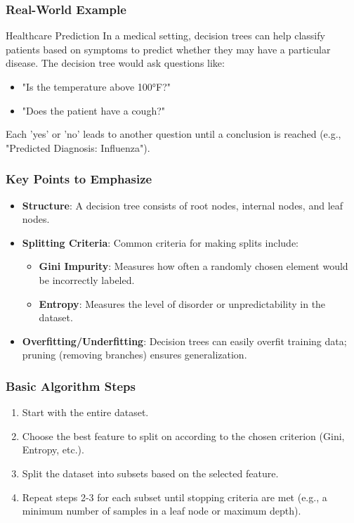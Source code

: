 \documentclass[aspectratio=169]{beamer}
\begin{document}
\begin{frame}[fragile]
    \frametitle{Real-World Example}
    
    \begin{block}{Healthcare Prediction}
        In a medical setting, decision trees can help classify patients based on symptoms to predict whether they may have a particular disease. The decision tree would ask questions like:
        
        \begin{itemize}
            \item "Is the temperature above 100°F?"
            \item "Does the patient have a cough?"
        \end{itemize}
        
        Each 'yes' or 'no' leads to another question until a conclusion is reached (e.g., "Predicted Diagnosis: Influenza").
    \end{block}
\end{frame}

\begin{frame}[fragile]
    \frametitle{Key Points to Emphasize}
    
    \begin{itemize}
        \item \textbf{Structure}: A decision tree consists of root nodes, internal nodes, and leaf nodes.
        \item \textbf{Splitting Criteria}: Common criteria for making splits include:
        \begin{itemize}
            \item \textbf{Gini Impurity}: Measures how often a randomly chosen element would be incorrectly labeled.
            \item \textbf{Entropy}: Measures the level of disorder or unpredictability in the dataset.
        \end{itemize}
        \item \textbf{Overfitting/Underfitting}: Decision trees can easily overfit training data; pruning (removing branches) ensures generalization.
    \end{itemize}
\end{frame}

\begin{frame}[fragile]
    \frametitle{Basic Algorithm Steps}
    
    \begin{enumerate}
        \item Start with the entire dataset.
        \item Choose the best feature to split on according to the chosen criterion (Gini, Entropy, etc.).
        \item Split the dataset into subsets based on the selected feature.
        \item Repeat steps 2-3 for each subset until stopping criteria are met (e.g., a minimum number of samples in a leaf node or maximum depth).
    \end{enumerate}
\end{frame}
\end{document}
